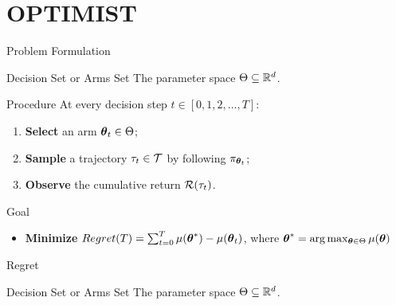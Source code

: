 \section{OPTIMIST}

\begin{frame}{Problem Formulation}

\onslide<+->\begin{block}{Decision Set or Arms Set}
The parameter space $\Theta\subseteq\mathbb{R}^d$.
\end{block}

\onslide<+->\begin{block}{Procedure}
At every decision step $t\in[0,1,2,\dots,T]$:
	\begin{enumerate}
			\item<+-> \textbf{Select} an arm $\boldsymbol{\theta}_t\in\Theta$;
			\item<+-> \textbf{Sample} a trajectory $\tau_t\in\mathcal{T}$ by following $\pi_{\boldsymbol{\theta}_t}$;
			\item<+-> \textbf{Observe} the cumulative return $\mathcal{R}(\tau_t)$.
		\end{enumerate}
\end{block}

\onslide<+->\begin{block}{Goal}
\begin{itemize}
\item \textbf{Minimize} $Regret(T) = \sum_{t=0}^{T}\mu(\boldsymbol{\theta}^*)-\mu(\boldsymbol{\theta}_t)$, where $\boldsymbol{\theta}^*=\arg\max_{\boldsymbol{\theta}\in\Theta}\mu(\boldsymbol{\theta})$
\end{itemize}
\end{block}


\end{frame}


\begin{frame}{Regret}

\onslide<+->\begin{block}{Decision Set or Arms Set}
The parameter space $\Theta\subseteq\mathbb{R}^d$.
\end{block}

\end{frame}

